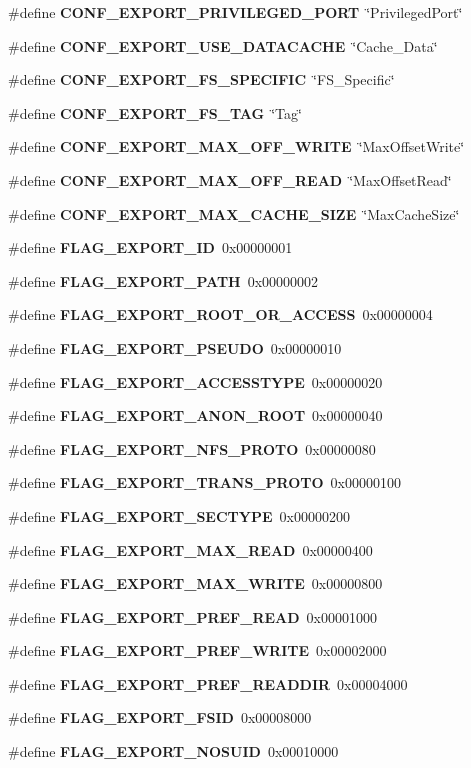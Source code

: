 \begin{CompactItemize}
\item 
\#define {\bf CONF\_\-EXPORT\_\-PRIVILEGED\_\-PORT}\ \char`\"{}Privileged\-Port\char`\"{}
\item 
\#define {\bf CONF\_\-EXPORT\_\-USE\_\-DATACACHE}\ \char`\"{}Cache\_\-Data\char`\"{}
\item 
\#define {\bf CONF\_\-EXPORT\_\-FS\_\-SPECIFIC}\ \char`\"{}FS\_\-Specific\char`\"{}
\item 
\#define {\bf CONF\_\-EXPORT\_\-FS\_\-TAG}\ \char`\"{}Tag\char`\"{}
\item 
\#define {\bf CONF\_\-EXPORT\_\-MAX\_\-OFF\_\-WRITE}\ \char`\"{}Max\-Offset\-Write\char`\"{}
\item 
\#define {\bf CONF\_\-EXPORT\_\-MAX\_\-OFF\_\-READ}\ \char`\"{}Max\-Offset\-Read\char`\"{}
\item 
\#define {\bf CONF\_\-EXPORT\_\-MAX\_\-CACHE\_\-SIZE}\ \char`\"{}Max\-Cache\-Size\char`\"{}
\item 
\#define {\bf FLAG\_\-EXPORT\_\-ID}\ 0x00000001
\item 
\#define {\bf FLAG\_\-EXPORT\_\-PATH}\ 0x00000002
\item 
\#define {\bf FLAG\_\-EXPORT\_\-ROOT\_\-OR\_\-ACCESS}\ 0x00000004
\item 
\#define {\bf FLAG\_\-EXPORT\_\-PSEUDO}\ 0x00000010
\item 
\#define {\bf FLAG\_\-EXPORT\_\-ACCESSTYPE}\ 0x00000020
\item 
\#define {\bf FLAG\_\-EXPORT\_\-ANON\_\-ROOT}\ 0x00000040
\item 
\#define {\bf FLAG\_\-EXPORT\_\-NFS\_\-PROTO}\ 0x00000080
\item 
\#define {\bf FLAG\_\-EXPORT\_\-TRANS\_\-PROTO}\ 0x00000100
\item 
\#define {\bf FLAG\_\-EXPORT\_\-SECTYPE}\ 0x00000200
\item 
\#define {\bf FLAG\_\-EXPORT\_\-MAX\_\-READ}\ 0x00000400
\item 
\#define {\bf FLAG\_\-EXPORT\_\-MAX\_\-WRITE}\ 0x00000800
\item 
\#define {\bf FLAG\_\-EXPORT\_\-PREF\_\-READ}\ 0x00001000
\item 
\#define {\bf FLAG\_\-EXPORT\_\-PREF\_\-WRITE}\ 0x00002000
\item 
\#define {\bf FLAG\_\-EXPORT\_\-PREF\_\-READDIR}\ 0x00004000
\item 
\#define {\bf FLAG\_\-EXPORT\_\-FSID}\ 0x00008000
\item 
\#define {\bf FLAG\_\-EXPORT\_\-NOSUID}\ 0x00010000
\item 

\end{CompactItemize}
